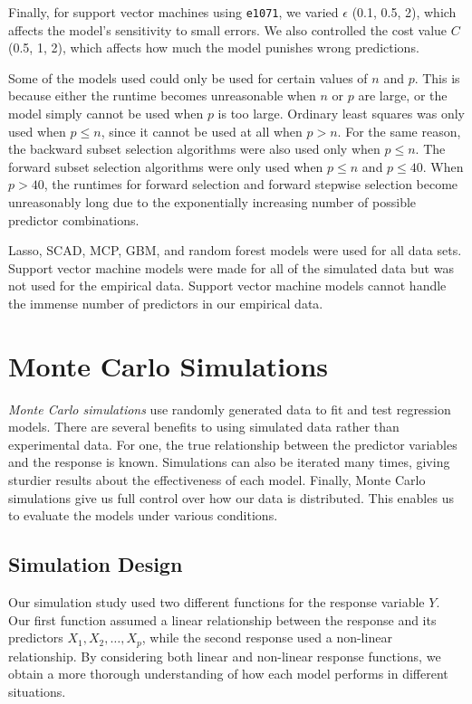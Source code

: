 \documentclass{article}
\begin{document}
	Finally, for support vector machines using \lstinline!e1071!, we varied $\epsilon$ (0.1, 0.5, 2), which affects the model's sensitivity to small errors. We also controlled the cost value $C$ (0.5, 1, 2), which affects how much the model punishes wrong predictions.
	
	Some of the models used could only be used for certain values of $n$ and $p$. This is because either the runtime becomes unreasonable when $n$ or $p$ are large, or the model simply cannot be used when $p$ is too large. Ordinary least squares was only used when $p\leq n$, since it cannot be used at all when $p>n$. For the same reason, the backward subset selection algorithms were also used only when $p\leq n$. The forward subset selection algorithms were only used when $p\leq n$ and $p\leq 40$. When $p>40$, the runtimes for forward selection and forward stepwise selection become unreasonably long due to the exponentially increasing number of possible predictor combinations.
	
	Lasso, SCAD, MCP, GBM, and random forest models were used for all data sets. Support vector machine models were made for all of the simulated data but was not used for the empirical data. Support vector machine models cannot handle the immense number of predictors in our empirical data.
	
	\section{Monte Carlo Simulations}\label{sec:simulations}
	
	\textit{Monte Carlo simulations} use randomly generated data to fit and test regression  models. There are several benefits to using simulated data rather than experimental data. For one, the true relationship between the predictor variables and the response is known. Simulations can also be iterated many times, giving sturdier results about the effectiveness of each model. Finally, Monte Carlo simulations give us full control over how our data is distributed. This enables us to evaluate the models under various conditions.
	
	
	\subsection{Simulation Design}
	
	Our simulation study used two different functions for the response variable $Y$. Our first function assumed a linear relationship between the response and its predictors $X_1, X_2, \dotsc, X_p$, while the second response used a non-linear relationship. By considering both linear and non-linear response functions, we obtain a more thorough understanding of how each model performs in different situations.
	
\end{document}
